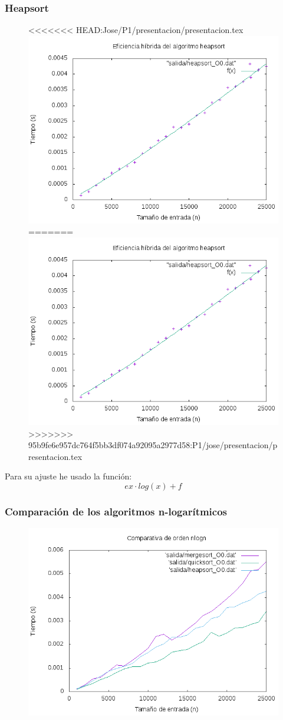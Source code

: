 \documentclass[spanish]{beamer}
\begin{document}
   \begin{frame}\frametitle{Heapsort}
    \begin{figure}[H]
    \centering   
<<<<<<< HEAD:Jose/P1/presentacion/presentacion.tex
    \includegraphics[clip,width=0.6\columnwidth]{../plots/heapsort_O0_fit.png}%
=======
    \includegraphics[clip,width=0.76\columnwidth]{../plots/heapsort_O0_fit.png}%
>>>>>>> 95b9fe6e957dc764f5bb3df074a92095a2977d58:P1/jose/presentacion/presentacion.tex
    \end{figure}

    Para su ajuste he usado la función: $$ex\cdot log(x)+f$$
       
  \end{frame}

\begin{frame}\frametitle{Comparación de los algoritmos n-logarítmicos}
  \begin{figure}[H]
    \centering   
        \includegraphics[clip,width=0.8\columnwidth]{../plots/logaritmicos_O0.png}%
    \end{figure}
  \end{frame}
\end{document}
